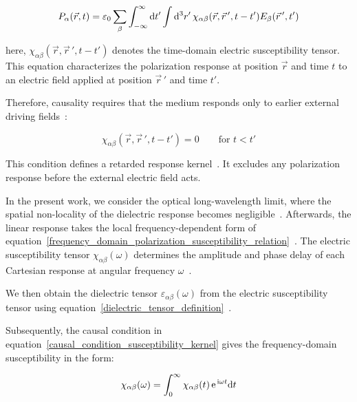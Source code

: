 \begin{equation}
    P_{\alpha}(\vec{r},t) = 
    \varepsilon_0\sum_{\beta}\int_{-\infty}^{\infty}\mathrm{d}{t'}
    \int\mathrm{d}^3{r'}\,\chi_{\alpha\beta}(\vec{r},\vec{r}\,',t-t')
    E_{\beta}(\vec{r}\,',t')
\label{general_linear_response_polarization}
\end{equation}

here, $\chi_{\alpha\beta}(\vec{r},\vec{r}\,',t-t')$ denotes the time-domain electric susceptibility tensor.
This equation characterizes the polarization response at position $\vec{r}$ and time $t$ to an electric field applied at position $\vec{r}\,'$ and time $t'$.

Therefore, causality requires that the medium responds only to earlier external driving fields~\cite{stefanski2022analytical}:

\begin{equation}
    \chi_{\alpha\beta}(\vec{r},\vec{r}\,',t-t')=0
    \qquad \text{for $t<t'$}
\label{causal_condition_susceptibility_kernel}
\end{equation}

This condition defines a retarded response kernel~\cite{landau2013electrodynamics}.
It excludes any polarization response before the external electric field acts.

In the present work,
we consider the optical long-wavelength limit,
where the spatial non-locality of the dielectric response becomes negligible~\cite{agranovich2013crystal}.
Afterwards, the linear response takes the local frequency-dependent form of equation~\eqref{frequency_domain_polarization_susceptibility_relation}~\cite{franta2023dispersion}.
The electric susceptibility tensor $\chi_{\alpha\beta}(\omega)$ determines the amplitude and phase delay of each Cartesian response at angular frequency $\omega$~\cite{koutserimpas2024time}.

We then obtain the dielectric tensor $\varepsilon_{\alpha\beta}(\omega)$ from the electric susceptibility tensor using equation~\eqref{dielectric_tensor_definition}~\cite{franta2020symmetry}.

Subsequently, the causal condition in equation~\eqref{causal_condition_susceptibility_kernel}
gives the frequency-domain susceptibility in the form:

\begin{equation}
\chi_{\alpha\beta}(\omega) =
    \int_{0}^{\infty}
    \chi_{\alpha\beta}(t)
    \,\mathrm{e}^{\,\mathrm{i}\omega t}
    \mathrm{d}{t}
\label{frequency_domain_susceptibility_from_causality}
\end{equation}

